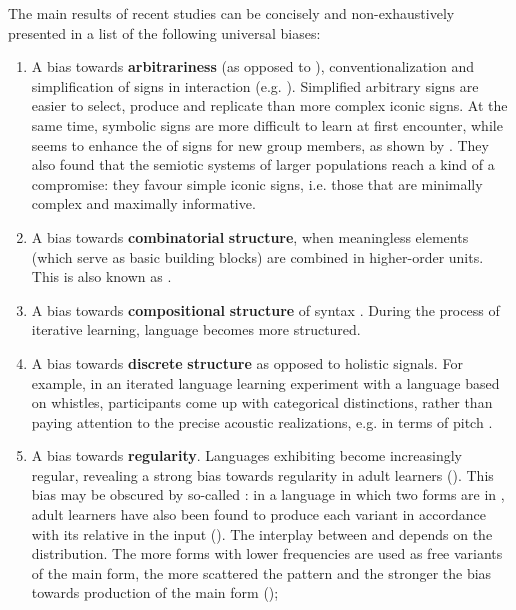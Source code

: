 \documentclass[output=paper]{langsci/langscibook}
\begin{document}
The main results of recent studies can be concisely and non-exhaustively presented in a list of the following universal biases: 

\begin{enumerate}
\item 
A bias towards \textbf{arbitrariness} (as opposed to ), conventionalization and simplification of signs in interaction (e.g. \citealt{CaldwellSmith2012}). Simplified arbitrary signs are easier to select, produce and replicate than more complex iconic signs. At the same time, symbolic signs are more difficult to learn at first encounter, while  seems to enhance the  of signs for new group members, as shown by \citet{FayEllison2013}. They also found that the semiotic systems of larger populations reach a kind of a compromise: they favour simple iconic signs, i.e. those that are minimally complex and maximally informative.
\item \sloppy
A bias towards \textbf{combinatorial} \textbf{structure}, when meaningless elements (which serve as basic building blocks) are combined in higher-order units. This is also known as  \citep{Verhoef2012}.
\item \fussy
A bias towards \textbf{compositional} \textbf{structure} of syntax \citep{KirbyEtAl2008}. During the process of iterative learning, language becomes more structured.
\item 
A bias towards \textbf{discrete} \textbf{structure} as opposed to holistic signals. For example, in an iterated language learning experiment with a language based on whistles, participants come up with categorical distinctions, rather than paying attention to the precise acoustic realizations, e.g. in terms of pitch \citep{Verhoef2012}.
\item 
A bias towards \textbf{regularity}. Languages exhibiting  become increasingly regular, revealing a strong bias towards regularity in adult learners (\citealt{SmithWonnacott2010}). This bias may be obscured by so-called : in a language in which two forms are in , adult learners have also been found to produce each variant in accordance with its relative  in the input (\citealt{HudsonKamNewport2009,WonnacottNewport2005}). The interplay between  and  depends on the  distribution. The more forms with lower frequencies are used as free variants of the main form, the more scattered the pattern and the stronger the bias towards production of the main form (\citealt{HudsonKamNewport2009});

\end{enumerate}
\end{document}
